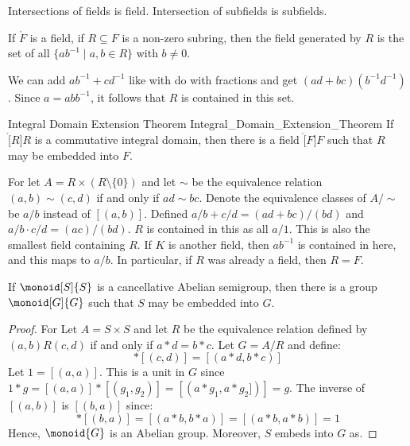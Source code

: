 \documentclass{book}                                                           %
\begin{document}
            Intersections of fields is field. Intersection of subfields is
            subfields.
            \begin{theorem}
                If $\ring{F}$ is a field, if $R\subseteq{F}$ is a non-zero
                subring, then the field generated by $R$ is the set of all
                $\{ab^{\minus{1}}\;|\;a,b\in{R}\}$ with $b\ne{0}$.
            \end{theorem}
            We can add $ab^{\minus{1}}+cd^{\minus{1}}$ like with do with
            fractions and get $(ad+bc)(b^{\minus{1}}d^{\minus{1}})$.
            Since $a=abb^{\minus{1}}$, it follows that $R$ is contained in
            this set.
            \begin{ftheorem}{Integral Domain Extension Theorem}
                            {Integral_Domain_Extension_Theorem}
                If $\ring[R]{R}$ is a commutative integral domain, then
                there is a field $\ring[F]{F}$ such that $R$ may be
                embedded into $F$.
            \end{ftheorem}
            \begin{bproof}
                For let $A=R\times(R\setminus\{0\})$ and let $\sim$ be the
                equivalence relation $(a,b)\sim(c,d)$ if and only if
                $ad\sim{b}c$. Denote the equivalence classes of
                $A/\sim$ be $a/b$ instead of $[(a,b)]$. Defined
                $a/b+c/d=(ad+bc)/(bd)$ and $a/b\cdot{c}/d=(ac)/(bd)$.
                $R$ is contained in this as all $a/1$. This is also the
                smallest field containing $R$. If $K$ is another field,
                then $ab^{\minus{1}}$ is contained in here, and this maps
                to $a/b$. In particular, if $R$ was already a field, then
                $R=F$.
            \end{bproof}
            \begin{theorem}
                If $\monoid[S]{S}$ is a cancellative Abelian semigroup, then
                there is a group $\monoid[G]{G}$ such that $S$ may be
                embedded into $G$.
            \end{theorem}
            \begin{proof}
                For Let $A=S\times{S}$ and let $R$ be the equivalence
                relation defined by $(a,b)R(c,d)$ if and only if
                $a*d=b*c$. Let $G=A/R$ and define:
                \begin{equation}
                    [(a,b)]*[(c,d)]=[(a*d,b*c)]
                \end{equation}
                Let $1=[(a,a)]$. This is a unit in $G$ since
                $1*g=[(a,a)]*[(g_{1},g_{2})]=[(a*g_{1},a*g_{2}])]=g$.
                The inverse of $[(a,b)]$ is $[(b,a)]$ since:
                \begin{equation}
                    [(a,b)]*[(b,a)]=[(a*b,b*a)]=[(a*b,a*b)]=1
                \end{equation}
                Hence, $\monoid{G}$ is an Abelian group. Moreover, $S$
                embeds into $G$ as.
            \end{proof}
\end{document}
